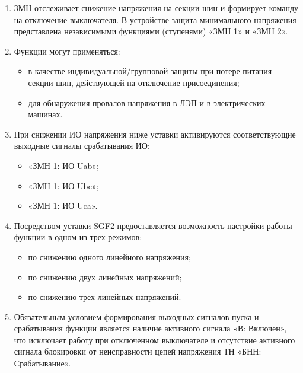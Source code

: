 
\color{black}

\begin{enumerate}

\item
ЗМН отслеживает снижение напряжения на секции шин и формирует команду на отключение выключателя. В устройстве защита минимального напряжения представлена независимыми функциями (ступенями) «ЗМН 1» и «ЗМН 2».

\item
Функции могут применяться:
\begin{itemize}
\item в качестве индивидуальной/групповой защиты при потере питания секции шин, действующей на отключение присоединения;
\item для обнаружения провалов напряжения в ЛЭП и в электрических машинах.
\end{itemize}

\item
При снижении ИО напряжения ниже уставки активируются соответствующие выходные сигналы срабатывания ИО:
\begin{itemize}
    \item «ЗМН 1: ИО Uab»;
    \item «ЗМН 1: ИО Ubc»;
    \item «ЗМН 1: ИО Uca».
\end{itemize}

\item
Посредством уставки SGF2 предоставляется возможность настройки работы функции в одном из трех режимов:
\begin{itemize}
    \item  по снижению одного линейного напряжения;
    \item по снижению двух линейных напряжений;
    \item  по снижению трех линейных напряжений.
\end{itemize}

\item
Обязательным условием формирования выходных сигналов пуска и срабатывания функции является наличие активного сигнала «В: Включен», что исключает работу при отключенном выключателе и отсутствие активного сигнала блокировки от неисправности цепей напряжения ТН «БНН: Срабатывание».


\end{enumerate}
